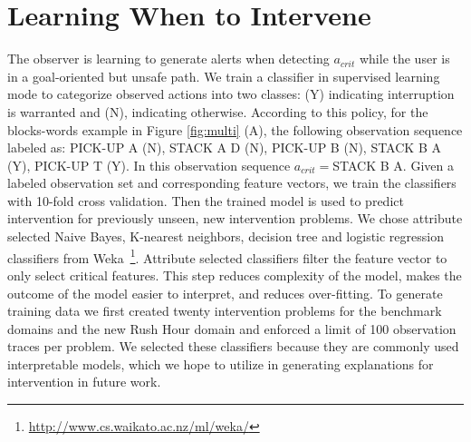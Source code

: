\documentclass[letterpaper]{article}
\theoremstyle{plain}
\begin{document}
\section{Learning When to Intervene}
The observer is learning to generate alerts when detecting $a_{crit}$ while the user is in a goal-oriented but unsafe path. %
We train a classifier in supervised learning mode to categorize observed actions into two classes: (Y) indicating interruption is warranted and (N), indicating otherwise. According to this policy, for the blocks-words example in Figure \ref{fig:multi} (A), the following observation sequence labeled as: PICK-UP A (N), STACK A D (N), PICK-UP B (N), STACK B A (Y), PICK-UP T (Y). In this observation sequence $a_{crit}=$STACK B A. Given a labeled observation set and corresponding feature vectors, we train the classifiers with 10-fold cross validation. Then the trained model is used to predict intervention for previously unseen, new intervention problems. We chose attribute selected Naive Bayes, K-nearest neighbors, decision tree and logistic regression classifiers from Weka~\footnote{\url{http://www.cs.waikato.ac.nz/ml/weka/}}. Attribute selected classifiers filter the feature vector to only select critical features. This step reduces complexity of the model, makes the outcome of the model easier to interpret, and reduces over-fitting. To generate training data we first created twenty intervention problems for the benchmark domains and the new Rush Hour domain and enforced a limit of 100 observation traces per problem. We selected these classifiers because they are commonly used interpretable models, which we hope to utilize in generating explanations for intervention in future work.

 
\end{document}
